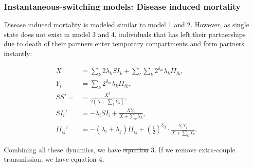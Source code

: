 \documentclass[10pt,letterpaper]{article}
\newcommand{\khalf}{\left(\frac{1}{2}\right)^{\delta_{ij}}}  %
\providecommand{\DIFaddtex}[1]{{\protect\color{blue}\uwave{#1}}} %
\providecommand{\DIFdeltex}[1]{{\protect\color{red}\sout{#1}}}                      %
\providecommand{\DIFaddbegin}{} %
\providecommand{\DIFaddend}{} %
\providecommand{\DIFdelbegin}{} %
\providecommand{\DIFdelend}{} %
\providecommand{\DIFadd}[1]{\texorpdfstring{\DIFaddtex{#1}}{#1}} %
\providecommand{\DIFdel}[1]{\texorpdfstring{\DIFdeltex{#1}}{}} %
\newcommand{\DIFscaledelfig}{0.5}
\newlength{\DIFdelgraphicswidth} %
\newlength{\DIFdelgraphicsheight} %
\newcommand{\DIFaddincludegraphics}[2][]{{\color{blue}\fbox{\DIFOincludegraphics[#1]{#2}}}} %
\newcommand{\DIFdelincludegraphics}[2][]{%
\sbox{\DIFdelgraphicsbox}{\DIFOincludegraphics[#1]{#2}}%
\settoboxwidth{\DIFdelgraphicswidth}{\DIFdelgraphicsbox} %
\settoboxtotalheight{\DIFdelgraphicsheight}{\DIFdelgraphicsbox} %
\scalebox{\DIFscaledelfig}{%
\parbox[b]{\DIFdelgraphicswidth}{\usebox{\DIFdelgraphicsbox}\\[-\baselineskip] \rule{\DIFdelgraphicswidth}{0em}}\llap{\resizebox{\DIFdelgraphicswidth}{\DIFdelgraphicsheight}{%
\setlength{\unitlength}{\DIFdelgraphicswidth}%
\begin{picture}(1,1)%
\thicklines\linethickness{2pt} %
{\color[rgb]{1,0,0}\put(0,0){\framebox(1,1){}}}%
{\color[rgb]{1,0,0}\put(0,0){\line( 1,1){1}}}%
{\color[rgb]{1,0,0}\put(0,1){\line(1,-1){1}}}%
\end{picture}%
}\hspace*{3pt}}} %
} %
\DeclareRobustCommand{\DIFaddbegin}{\DIFOaddbegin \let\includegraphics\DIFaddincludegraphics} %
\DeclareRobustCommand{\DIFaddend}{\DIFOaddend \let\includegraphics\DIFOincludegraphics} %
\DeclareRobustCommand{\DIFdelbegin}{\DIFOdelbegin \let\includegraphics\DIFdelincludegraphics} %
\DeclareRobustCommand{\DIFdelend}{\DIFOaddend \let\includegraphics\DIFOincludegraphics} %
\begin{document}
\subsubsection*{Instantaneous-switching models: Disease induced mortality}

Disease induced mortality is modeled similar to model 1 and 2. However, as single state does not exist in model 3 and 4, individuals that has left their partnerships due to death of their partners enter temporary compartments and form partners instantly:

\begin{equation}
\begin{aligned}
X &= \sum_k 2 \lambda_k SI_k + \sum_l \sum_k 2^{\delta_{lk}}  \lambda_k II_{lk}, \\
Y_i &=  \sum_k  2^{\delta_{ik}}  \lambda_k II_{ik}, \\
SS' = &= \frac{X^2}{2 (X + \sum_k Y_k)},\\
SI_i' &= - \lambda_i SI_i + \frac{X Y_i}{X + \sum_k Y_k},\\
II_{ij}' &= -(\lambda_i + \lambda_j) II_{ij} + \khalf \cdot \frac{Y_i Y_j}{X + \sum_k Y_k}.
\end{aligned}
\end{equation}

Combining all these dynamics, we have \DIFdelbegin \DIFdel{equation }\DIFdelend \DIFaddbegin \DIFadd{model }\DIFaddend 3. If we remove extra-couple transmission, we have \DIFdelbegin \DIFdel{equation }\DIFdelend \DIFaddbegin \DIFadd{model }\DIFaddend 4.
\end{document}
